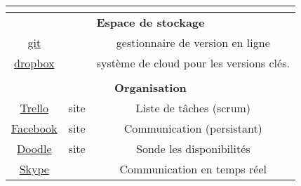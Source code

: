 \begin{tabular}{|c|c|c|}
	\hline
	\multicolumn{3}{c}{}\\
	\hline
	\multicolumn{3}{|c|}{\textbf{Espace de stockage}}\\
	\hline
		\href{https://bitbucket.org/}{git} & & gestionnaire de version en ligne\\
	\hline
		\href{https://www.dropbox.com/}{dropbox} & & système de cloud pour les versions clés.\\
	\hline
	\multicolumn{3}{c}{}\\
	\hline
	\multicolumn{3}{|c|}{\textbf{Organisation}}\\
	\hline
		\href{https://trello.com/}{Trello} & site & Liste de tâches (scrum) \\
	\hline
		\href{http://www.facebook.com/}{Facebook} & site & Communication (persistant) \\
	\hline
		\href{http://doodle.com/}{Doodle} & site & Sonde les disponibilités \\
	\hline
		\href{http://www.skype.com/intl/fr/get-skype/}{Skype} &  & Communication en temps réel \\
	\hline
\end{tabular}